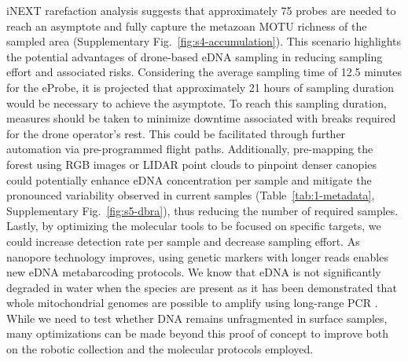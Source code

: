 iNEXT rarefaction analysis suggests that approximately 75 probes are needed to reach an asymptote and fully capture the metazoan \gls{MOTU} richness of the sampled area (Supplementary Fig.~\ref{fig:s4-accumulation}). This scenario highlights the potential advantages of drone-based \gls{eDNA} sampling in reducing sampling effort and associated risks. Considering the average sampling time of 12.5 minutes for the eProbe, it is projected that approximately 21 hours of sampling duration would be necessary to achieve the asymptote. To reach this sampling duration, measures should be taken to minimize downtime associated with breaks required for the drone operator's rest. This could be facilitated through further automation via pre-programmed flight paths. Additionally, pre-mapping the forest using RGB images or LIDAR point clouds to pinpoint denser canopies could potentially enhance \gls{eDNA} concentration per sample and mitigate the pronounced variability observed in current samples (Table~\ref{tab:1-metadata}, Supplementary Fig.~\ref{fig:s5-dbra}), thus reducing the number of required samples. Lastly, by optimizing the molecular tools to be focused on specific targets, we could increase detection rate per sample and decrease sampling effort. As nanopore technology improves, using genetic markers with longer reads enables new \gls{eDNA} metabarcoding protocols. We know that \gls{eDNA} is not significantly degraded in water when the species are present as it has been demonstrated that whole mitochondrial genomes are possible to amplify using long-range PCR \cite{deiner-2017}. While we need to test whether DNA remains unfragmented in surface samples, many optimizations can be made beyond this proof of concept to improve both on the robotic collection and the molecular protocols employed.

